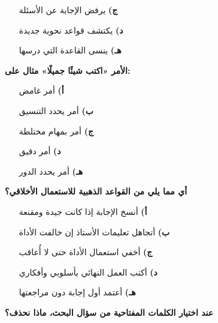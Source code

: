 \documentclass[11pt,a4paper]{article}
\begin{document}
\begin{multicols}{2}
\begin{minipage}{\linewidth}
\begin{itemize}[leftmargin=0.95cm, labelsep=4pt, itemsep=0pt, topsep=2pt, parsep=0pt]
  \item[\textbf{ج)}] يرفض الإجابة عن الأسئلة
  \item[\textbf{د)}] يكتشف قواعد نحوية جديدة
  \item[\textbf{هـ)}] ينسى القاعدة التي درسها
\end{itemize}
\end{minipage}\par\vspace{7pt plus 4pt}
\noindent\begin{minipage}{\linewidth}
\hangindent=0.7cm\textbf{الأمر «اكتب شيئًا جميلًا» مثال على:}
\begin{itemize}[leftmargin=0.95cm, labelsep=4pt, itemsep=0pt, topsep=2pt, parsep=0pt]
  \item[\textbf{أ)}] أمر غامض
  \item[\textbf{ب)}] أمر يحدد التنسيق
  \item[\textbf{ج)}] أمر بمهام مختلطة
  \item[\textbf{د)}] أمر دقيق
  \item[\textbf{هـ)}] أمر يحدد الدور
\end{itemize}
\end{minipage}\par\vspace{7pt plus 4pt}
\noindent\begin{minipage}{\linewidth}
\hangindent=0.7cm\textbf{أي مما يلي من القواعد الذهبية للاستعمال الأخلاقي؟}
\begin{itemize}[leftmargin=0.95cm, labelsep=4pt, itemsep=0pt, topsep=2pt, parsep=0pt]
  \item[\textbf{أ)}] أنسخ الإجابة إذا كانت جيدة ومقنعة
  \item[\textbf{ب)}] أتجاهل تعليمات الأستاذ إن خالفت الأداة
  \item[\textbf{ج)}] أخفي استعمال الأداة حتى لا أُعاقب
  \item[\textbf{د)}] أكتب العمل النهائي بأسلوبي وأفكاري
  \item[\textbf{هـ)}] أعتمد أول إجابة دون مراجعتها
\end{itemize}
\end{minipage}\par\vspace{7pt plus 4pt}
\noindent\begin{minipage}{\linewidth}
\hangindent=0.7cm\textbf{عند اختيار الكلمات المفتاحية من سؤال البحث، ماذا نحذف؟}
\begin{itemize}[leftmargin=0.95cm, labelsep=4pt, itemsep=0pt, topsep=2pt, parsep=0pt]

\end{itemize}
\end{minipage}
\end{multicols}
\end{document}
